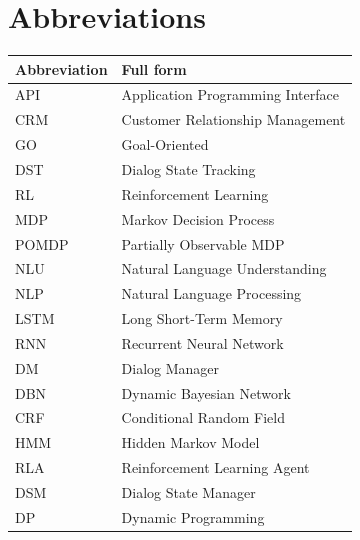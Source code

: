 \documentclass[12pt]{extarticle}
\numberwithin{equation}{section}
\begin{document}
	\clearpage
	\section*{Abbreviations}

\begin{table}[H]

	\label{my-label}
	\begin{tabular}{ll}
		\hline
		\multicolumn{1}{|l|}{Abbreviation} & \multicolumn{1}{l|}{Full form}    \\ \hline
		API                                & Application Programming Interface \\
		CRM                                & Customer Relationship Management  \\
		GO                                 & Goal-Oriented                     \\
		DST                                & Dialog State Tracking             \\
		RL                                 & Reinforcement Learning            \\
		MDP                                & Markov Decision Process           \\
		POMDP                              & Partially Observable MDP          \\
		NLU                                & Natural Language Understanding    \\
		NLP                                & Natural Language Processing       \\
		LSTM                               & Long Short-Term Memory            \\
		RNN                                & Recurrent Neural Network          \\
		DM                                 & Dialog Manager                    \\
		DBN                                & Dynamic Bayesian Network          \\
		CRF                                & Conditional Random Field          \\
		HMM                                & Hidden Markov Model               \\
		RLA                                & Reinforcement Learning Agent      \\
		DSM                                & Dialog State Manager              \\
		DP                                 & Dynamic Programming               \\

\end{tabular}
\end{table}
\end{document}
